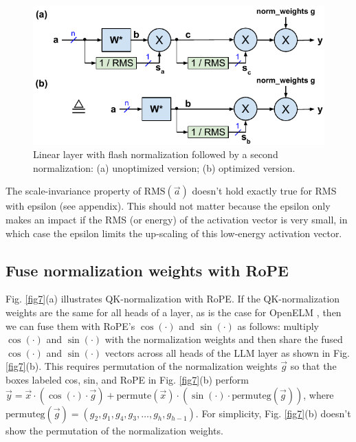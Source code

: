 \documentclass{article}
\numberwithin{equation}{section} %
\def\rms{\text{RMS}(\vec{a})}         %
\def\vx{\vec{x}}                      %
\def\vy{\vec{y}}                      %
\def\vg{\vec{g}}                      %
\def\cosi{\cos{(\cdot)}}              %
\def\sini{\sin{(\cdot)}}              %
\begin{document}
\begin{figure}[h!] \centering
  \includegraphics[scale=0.9]{../doc/fig/flashNorm_fig6.pdf}
  \caption{Linear layer with flash normalization followed by a second normalization: (a) unoptimized version; (b) optimized version.}
\label{fig6} \end{figure}

The scale-invariance property of $\rms$ doesn’t hold exactly true for RMS with epsilon (see appendix). This should not matter because the epsilon only makes an impact if the RMS (or energy) of the activation vector is very small, in which case the epsilon limits the up-scaling of this low-energy activation vector.

\subsection{Fuse normalization weights with RoPE}
Fig. \ref{fig7}(a) illustrates QK-normalization with RoPE. If the QK-normalization weights are the same for all heads of a layer, as is the case for OpenELM \citep{openelm}, then we can fuse them with RoPE's $\cosi$ and $\sini$ as follows: multiply $\cosi$ and $\sini$ with the normalization weights and then share the fused $\cosi$ and $\sini$ vectors across all heads of the LLM layer as shown in Fig. \ref{fig7}(b). This requires permutation of the normalization weights $\vg$ so that the boxes labeled cos, sin, and RoPE in Fig. \ref{fig7}(b) perform $\vy = \vx \cdot \left( \cosi \cdot \vg \right) + \text{permute}(\vx) \cdot \left( \sini \cdot \text{permuteg}(\vg) \right)$, where $\text{permuteg}(\vg) = (g_2, g_1, g_4, g_3, \dots, g_h, g_{h-1})$. For simplicity, Fig. \ref{fig7}(b) doesn't show the permutation of the normalization weights.
\end{document}
